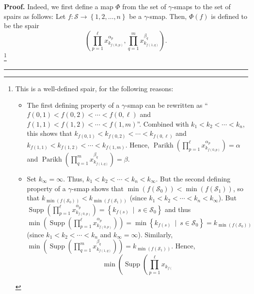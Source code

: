 \documentclass
[numbers=enddot,12pt,final,onecolumn,notitlepage,abstracton]{scrartcl}%
\theoremstyle{definition}
\newenvironment{proof}[1][Proof]{\noindent\textbf{#1.} }{\ \rule{0.5em}{0.5em}}
\newenvironment{verlong}{}{}
\let\prodnonlimits\prod
\renewcommand{\prod}{\prodnonlimits\limits}
\begin{document}
\begin{proof}
\begin{verlong}
Indeed, we first define a map $\Phi$ from the set of $\gamma$-smaps to the set
of spairs as follows: Let $f:\mathcal{S}\rightarrow\left\{  1,2,\ldots
,n\right\}  $ be a $\gamma$-smap. Then, $\Phi\left(  f\right)  $ is defined to
be the spair%
\[
\left(  \prod_{p=1}^{\ell}x_{k_{f\left(  0,p\right)  }}^{\alpha_{p}}%
,\prod_{q=1}^{m}x_{k_{f\left(  1,q\right)  }}^{\beta_{q}}\right)  .
\]
\footnote{This is a well-defined spair, for the following reasons:
\par
\begin{itemize}
\item The first defining property of a $\gamma$-smap can be rewritten as
\textquotedblleft$f\left(  0,1\right)  <f\left(  0,2\right)  <\cdots<f\left(
0,\ell\right)  $ and $f\left(  1,1\right)  <f\left(  1,2\right)
<\cdots<f\left(  1,m\right)  $\textquotedblright. Combined with $k_{1}%
<k_{2}<\cdots<k_{n}$, this shows that $k_{f\left(  0,1\right)  }<k_{f\left(
0,2\right)  }<\cdots<k_{f\left(  0,\ell\right)  }$ and $k_{f\left(
1,1\right)  }<k_{f\left(  1,2\right)  }<\cdots<k_{f\left(  1,m\right)  }$.
Hence, $\operatorname*{Parikh}\left(  \prod_{p=1}^{\ell}x_{k_{f\left(
0,p\right)  }}^{\alpha_{p}}\right)  =\alpha$ and $\operatorname*{Parikh}%
\left(  \prod_{q=1}^{m}x_{k_{f\left(  1,q\right)  }}^{\beta_{q}}\right)
=\beta$.
\par
\item Set $k_{\infty}=\infty$. Thus, $k_{1}<k_{2}<\cdots<k_{n}<k_{\infty}$.
But the second defining property of a $\gamma$-smap shows that $\min\left(
f\left(  \mathcal{S}_{0}\right)  \right)  <\min\left(  f\left(  \mathcal{S}%
_{1}\right)  \right)  $, so that $k_{\min\left(  f\left(  \mathcal{S}%
_{0}\right)  \right)  }<k_{\min\left(  f\left(  \mathcal{S}_{1}\right)
\right)  }$ (since $k_{1}<k_{2}<\cdots<k_{n}<k_{\infty}$). But
$\operatorname*{Supp}\left(  \prod_{p=1}^{\ell}x_{k_{f\left(  0,p\right)  }%
}^{\alpha_{p}}\right)  =\left\{  k_{f\left(  s\right)  }\ \mid\ s\in
\mathcal{S}_{0}\right\}  $ and thus $\min\left(  \operatorname*{Supp}\left(
\prod_{p=1}^{\ell}x_{k_{f\left(  0,p\right)  }}^{\alpha_{p}}\right)  \right)
=\min\left\{  k_{f\left(  s\right)  }\ \mid\ s\in\mathcal{S}_{0}\right\}
=k_{\min\left(  f\left(  \mathcal{S}_{0}\right)  \right)  }$ (since
$k_{1}<k_{2}<\cdots<k_{n}$ and $k_{\infty}=\infty$). Similarly, $\min\left(
\operatorname*{Supp}\left(  \prod_{q=1}^{m}x_{k_{f\left(  1,q\right)  }%
}^{\beta_{q}}\right)  \right)  =k_{\min\left(  f\left(  \mathcal{S}%
_{1}\right)  \right)  }$. Hence,%
\[
\min\left(  \operatorname*{Supp}\left(  \prod_{p=1}^{\ell}x_{k_{f\left(
}}\]
\end{itemize}}
\end{verlong}
\end{proof}
\end{document}
